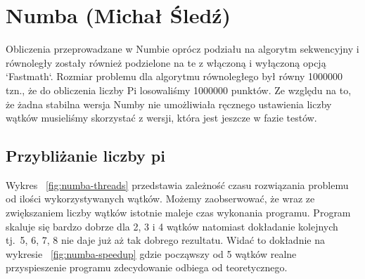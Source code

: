 \section{Numba (Michał Śledź)}
Obliczenia przeprowadzane w Numbie oprócz podziału na algorytm sekwencyjny i równoległy
zostały również podzielone na te z włączoną i wyłączoną  opcją `Fastmath`.
Rozmiar problemu dla algorytmu równoległego był równy 1000000 tzn., że do obliczenia
liczby Pi losowaliśmy 1000000 punktów.
Ze względu na to, że żadna stabilna wersja Numby nie umożliwiała ręcznego ustawienia
liczby wątków musieliśmy skorzystać z wersji, która jest jeszcze w fazie testów.


\subsection{Przybliżanie liczby pi}

\begin{figure*}
    \centering
    \begin{minipage}[b]{.45\textwidth}
        \centering
        
        \caption{Przyspieszenie liczenia liczby $\pi$ w Numbie}
        \label{fig:numba-speedup}
    \end{minipage}
    \hfill
    \begin{minipage}[b]{.45\textwidth}
        \centering
        
        \caption{Czas wykonania algorytmu w Numbie w zależności od liczby wątków}
        \label{fig:numba-threads}
    \end{minipage}
\end{figure*}

\begin{figure*}
    \centering
    
    \caption{Czas równoległego wykonania algorytmu w Numbie w zależności od rozmiaru problemu}
    \label{fig:numba-parallel-sizes}
\end{figure*}

Wykres ~\ref{fig:numba-threads} przedstawia zależność czasu rozwiązania problemu
od ilości wykorzystywanych
wątków.
Możemy zaobserwować, że wraz ze zwiększaniem liczby wątków istotnie maleje czas
wykonania programu.
Program skaluje się bardzo dobrze dla 2, 3 i 4 wątków natomiast
dokładanie kolejnych tj.\ 5, 6, 7, 8 nie daje już aż tak dobrego rezultatu.
Widać to dokładnie
na wykresie ~\ref{fig:numba-speedup} gdzie począwszy od 5 wątków realne przyspieszenie
programu zdecydowanie odbiega od teoretycznego.

